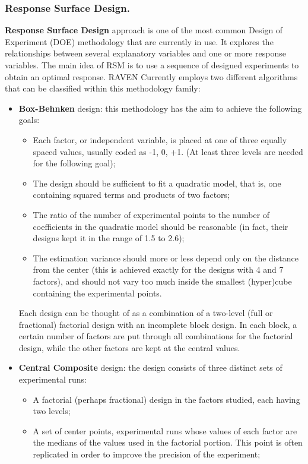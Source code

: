 \subsubsection{Response Surface Design.}
\label{subsubsubsec:RespSurfDOE}
\textbf{Response Surface Design} approach is one of the most common Design of Experiment (DOE) methodology that are currently in use. It explores the relationships between several explanatory variables and one or more response variables.  The main idea of RSM is to use a sequence of designed experiments to obtain an optimal response. RAVEN Currently  employs two different algorithms that can be classified within this methodology family:
\begin{itemize}
 \item \textbf{Box-Behnken} design: this methodology has the aim to achieve the following goals:
\begin{itemize}
\item  Each factor, or independent variable, is placed at one of three equally spaced values, usually coded as -1, 0, +1. (At least three levels are needed for the following goal);
\item  The design should be sufficient to fit a quadratic model, that is, one containing squared terms and products of two factors;
\item  The ratio of the number of experimental points to the number of coefficients in the quadratic model should be reasonable (in fact, their designs kept it in the range of 1.5 to 2.6);
\item  The estimation variance should more or less depend only on the distance from the center (this is achieved exactly for the designs with 4 and 7 factors), and should not vary too much inside the smallest (hyper)cube containing the experimental points.
\end{itemize}
Each design can be thought of as a combination of a two-level (full or fractional) factorial design with an incomplete block design. In each block, a certain number of factors are put through all combinations for the factorial design, while the other factors are kept at the central values.
 \item \textbf{Central Composite} design:
the design consists of three distinct sets of experimental runs:
\begin{itemize}
\item  A factorial (perhaps fractional) design in the factors studied, each having two levels;
\item  A set of center points, experimental runs whose values of each factor are the medians of the values used in the factorial portion. This point is often replicated in order to improve the precision of the experiment;

\end{itemize}
\end{itemize}
